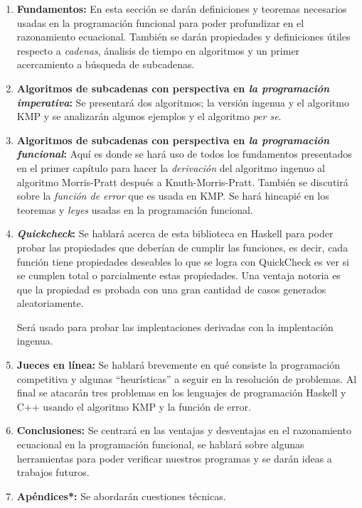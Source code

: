 \documentclass[letterpaper,10pt]{article}
\begin{document}
\begin{enumerate}

\item \textbf{Fundamentos:} En esta sección se darán definiciones y teoremas necesarios usadas en
la programación funcional para poder profundizar en el razonamiento ecuacional. También se darán
propiedades y definiciones útiles respecto a \textit{cadenas}, ánalisis de tiempo en algoritmos y
un primer acercamiento a búsqueda de subcadenas.

\item \textbf{Algoritmos de subcadenas con perspectiva en \textit{la programación imperativa}:} Se
presentará dos algoritmos; la versión ingenua y el algoritmo KMP y se analizarán algunos ejemplos
y el algoritmo \textit{per se}.

\item \textbf{Algoritmos de subcadenas con perspectiva en \textit{la programación funcional}:}
Aquí es donde se hará uso de todos los fundamentos presentados en el primer capítulo para hacer la
\textit{derivación} del algoritmo ingenuo al algoritmo Morris-Pratt después a Knuth-Morris-Pratt.
También se discutirá sobre la \textit{función de error} que es usada en KMP. Se hará hincapié en
los teoremas y \textit{leyes} usadas en la programación funcional.

\item \textbf{\textit{Quickcheck}:} Se hablará acerca de esta biblioteca en Haskell para poder
probar las propiedades que deberían de cumplir las funciones, es decir, cada función tiene
propiedades deseables lo que se logra con QuickCheck es ver si se cumplen total o parcialmente
estas propiedades. Una ventaja notoria es que la propiedad es probada con una gran cantidad de
casos generados aleatoriamente.

Será usado para probar las implentaciones derivadas con la implentación ingenua.

\item \textbf{Jueces en línea:} Se hablará brevemente en qué consiste la programación competitiva
y algunas ``heurísticas'' a seguir en la resolución de problemas. Al final se atacarán tres
problemas en los lenguajes de programación Haskell y C++ usando el algoritmo KMP y la función
de error.

\item \textbf{Conclusiones:} Se centrará en las ventajas y desventajas en el razonamiento
ecuacional en la programación funcional, se hablará sobre algunas herramientas para poder
verificar nuestros programas y se darán ideas a trabajos futuros.

\item \textbf{Apéndices*:} Se abordarán cuestiones técnicas.

\end{enumerate}
\end{document}
